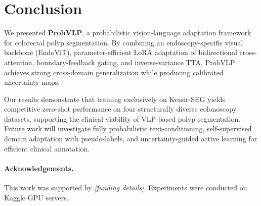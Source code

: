 
\section{Conclusion}
\label{sec:conclusion}

We presented \textbf{ProbVLP}, a probabilistic vision-language adaptation framework
for colorectal polyp segmentation. By combining an endoscopy-specific visual backbone
(EndoViT), parameter-efficient LoRA adaptation of bidirectional cross-attention,
boundary-feedback gating, and inverse-variance TTA, ProbVLP achieves strong
cross-domain generalization while producing calibrated uncertainty maps.

Our results demonstrate that training exclusively on Kvasir-SEG yields competitive
zero-shot performance on four structurally diverse colonoscopy datasets, supporting
the clinical viability of VLP-based polyp segmentation. Future work will investigate
fully probabilistic text-conditioning, self-supervised domain adaptation with
pseudo-labels, and uncertainty-guided active learning for efficient clinical annotation.

\paragraph{Acknowledgements.}
This work was supported by \textit{[funding details]}.
Experiments were conducted on Kaggle GPU servers.
